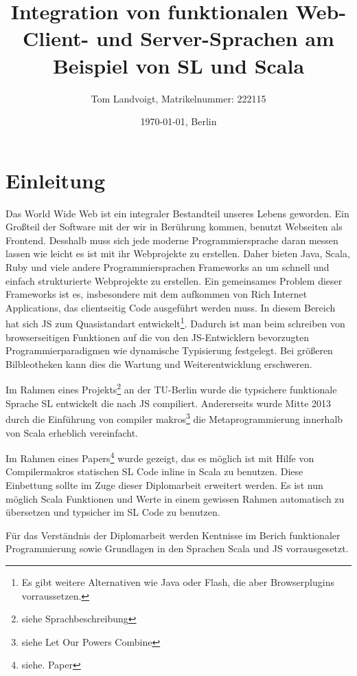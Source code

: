 \documentclass[12pt]{scrreprt}
\title{Integration von funktionalen Web-Client- und Server-Sprachen am Beispiel von SL und Scala}
\author{Tom Landvoigt, Matrikelnummer: 222115}
\date{\today{}, Berlin}
\begin{document}
\maketitle
\tableofcontents

\newpage

\lstset{basicstyle=\ttfamily\small, numbers=left, numberstyle=\tiny}

\section{Einleitung}
\cite{Burmako2013}\cite{Kossakowski2012}

Das World Wide Web ist ein integraler Bestandteil unseres Lebens geworden. Ein Großteil der Software mit der wir in Berührung kommen, benutzt Webseiten als Frontend. Desshalb muss sich jede moderne Programmiersprache daran messen lassen wie leicht es ist mit ihr Webprojekte zu erstellen. Daher bieten Java, Scala, Ruby und viele andere Programmiersprachen Frameworks an um schnell und einfach strukturierte Webprojekte zu erstellen. Ein gemeinsames Problem dieser Frameworks ist es, insbesondere mit dem aufkommen von Rich Internet Applications, das clientseitig Code ausgeführt werden muss. In diesem Bereich hat sich \ac{JS} zum Quasistandart entwickelt\footnote{Es gibt weitere Alternativen wie Java oder Flash, die aber Browserplugins vorraussetzen.}. Dadurch ist man beim schreiben von browserseitigen Funktionen auf die von den \ac{JS}-Entwicklern bevorzugten Programmierparadigmen wie dynamische Typisierung festgelegt. Bei größeren Bilbleotheken kann dies die Wartung und Weiterentwicklung erschweren.

Im Rahmen eines Projekts\footnote{siehe Sprachbeschreibung} an der TU-Berlin wurde die typsichere funktionale Sprache \ac{SL} entwickelt die nach \ac{JS} compiliert. Andererseits wurde Mitte 2013 durch die Einführung von compiler makros\footnote{siehe Let Our Powers Combine} die Metaprogrammierung innerhalb von Scala erheblich vereinfacht.

Im Rahmen eines Papers\footnote{siehe. Paper} wurde gezeigt, das es möglich ist mit Hilfe von Compilermakros statischen \ac{SL} Code inline in Scala zu benutzen. Diese Einbettung sollte im Zuge dieser Diplomarbeit erweitert werden. Es ist nun möglich Scala Funktionen und Werte in einem gewissen Rahmen automatisch zu übersetzen und typsicher im \ac{SL} Code zu benutzen.

Für das Verständnis der Diplomarbeit werden Kentnisse im Berich funktionaler Programmierung sowie Grundlagen in den Sprachen Scala und \ac{JS} vorrausgesetzt.
\end{document}

